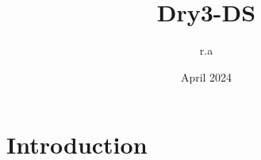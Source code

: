 \documentclass{article}
\title{Dry3-DS}
\author{r.a }
\date{April 2024}
\begin{document}
\maketitle

\section{Introduction}
\end{document}
